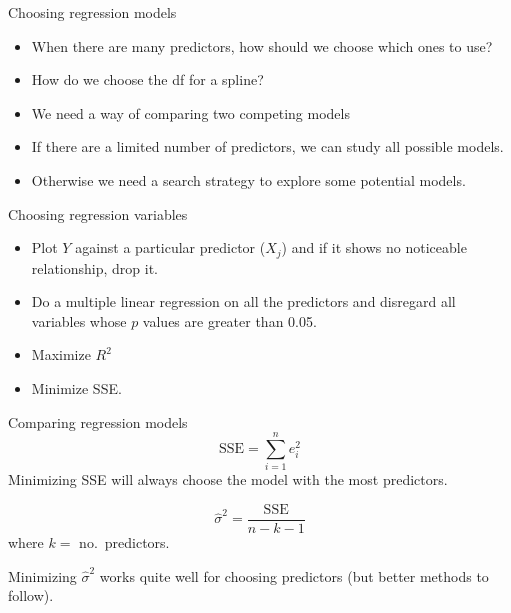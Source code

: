 \documentclass[14pt]{beamer}
\makeatletter
\def\biz{\begin{itemize}[<+-| alert@+>]}
\def\eiz{\end{itemize}}
\makeatother
\begin{document}
\begin{frame}{Choosing regression models}
\biz
\item When there are many predictors, how should we choose which ones to use?

\item How do we choose the df for a spline?

\item We need a way of comparing two competing models

\item If there are a limited number of predictors, we can study all possible models.

\item Otherwise we need a search strategy to explore some potential models.
\eiz

\end{frame}


\begin{frame}{Choosing regression variables}


\biz
\item Plot $Y$ against a particular predictor ($X_j$)
       and if it shows no noticeable relationship,  drop it.


\item Do a multiple linear regression on all the predictors
      and
      disregard all variables whose  $p$ values are greater than 0.05.

\item Maximize $R^2$

\item Minimize SSE.
\eiz
\end{frame}%

\begin{frame}{Comparing regression models}
\[\text{SSE} = \sum_{i=1}^n e_i^2 \]
Minimizing SSE will always choose the model with the most predictors.

\pause
{}
\[
\hat{\sigma}^2 = \frac{\text{SSE}}{n-k-1}
\]
where $k=$ no.\ predictors.\pause

Minimizing $\hat{\sigma}^2$ works quite well for choosing predictors (but better methods to follow).

\end{frame}
\end{document}
